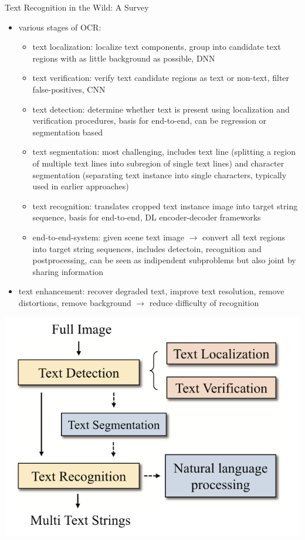 Text Recognition in the Wild: A Survey~\citep{chen_text_2021}
\begin{itemize}
    \item various stages of \ac{OCR}:
        \begin{itemize}
            \item text localization: localize text components, group into candidate text regions with
                as little background as possible, DNN
            \item text verification: verify text candidate regions as text or non-text,
                filter false-positives, CNN
            \item text detection: determine whether text is present using localization and verification
                procedures, basis for end-to-end, can be regression or segmentation based
            \item text segmentation: most challenging, includes text line (splitting a region of multiple
                text lines into subregion of single text lines) and character segmentation (separating
                text instance into single characters, typically used in earlier approaches)
            \item text recognition: translates cropped text instance image into target string sequence,
                basis for end-to-end, DL encoder-decoder frameworks
            \item end-to-end-system: given scene text image $\rightarrow$ convert all text regions into
                target string sequences, includes detectoin, recognition and postprocessing, can be
                seen as indipendent subproblems but also joint by sharing information
        \end{itemize}
    \item text enhancement: recover degraded text, improve text resolution, remove distortions,
        remove background $\rightarrow$ reduce difficulty of recognition
\end{itemize}
\includegraphics{img/OCR-Basics.png}


